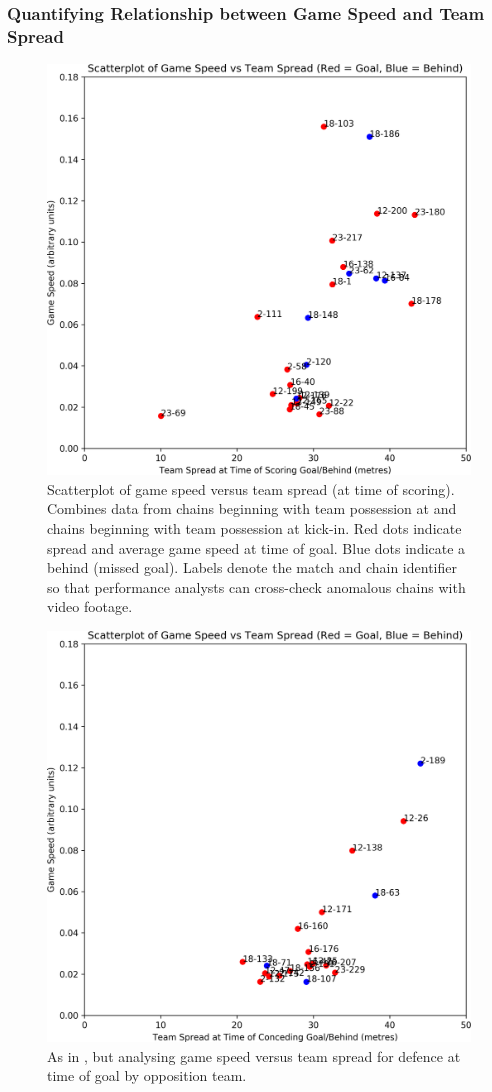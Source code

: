\subsubsection{Quantifying Relationship between Game Speed and Team Spread}

\begin{figure}[!htb]
\centering
\includegraphics[width=0.8\linewidth]{figs/paper/speed-vs-spread-succeed.png}
\caption{Scatterplot of game speed versus team spread (at time of scoring). Combines data from chains beginning with team possession at \centrebounce{} and chains beginning with team possession at kick-in. Red dots indicate spread and average game speed at time of goal. Blue dots indicate a behind (missed goal). Labels denote the match and chain identifier so that performance analysts can cross-check anomalous chains with video footage.}
\label{fig:speed-vs-spread-attack}
\end{figure}

\begin{figure}[!htb]
\centering
\includegraphics[width=0.8\linewidth]{figs/paper/speed-vs-spread-concede.png}
\caption{As in , but analysing game speed versus team spread for defence at time of goal by opposition team.}
\label{fig:speed-vs-spread-defence}
\end{figure}

